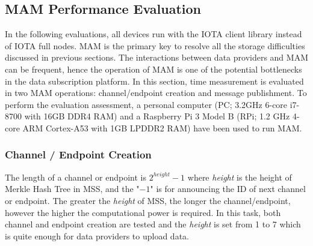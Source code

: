 \documentclass[10pt, conference, compsocconf]{IEEEtran}
\begin{document}
\subsection{MAM Performance Evaluation}
\label{section:mam_performance}
In the following evaluations, all devices run with the IOTA client library instead of IOTA full nodes. MAM is the primary key to resolve all the storage difficulties discussed in previous sections. The interactions between data providers and MAM can be frequent, hence the operation of MAM is one of the potential bottlenecks in the data subscription platform. In this section, time measurement is evaluated in two MAM operations: channel/endpoint creation and message publishment. To perform the evaluation assessment, a personal computer (PC; 3.2GHz 6-core i7-8700 with 16GB DDR4 RAM) and a Raspberry Pi 3 Model B (RPi; 1.2 GHz 4-core ARM Cortex-A53 with 1GB LPDDR2 RAM) have been used to run MAM.

\subsubsection{Channel / Endpoint Creation}
The length of a channel or endpoint is $2^{height}-1$ where \textit{height} is the height of Merkle Hash Tree in MSS, and the "$-1$" is for announcing the ID of next channel or endpoint. The greater the \textit{height} of MSS, the longer the channel/endpoint, however the higher the computational power is required. In this task, both channel and endpoint creation are tested and the \textit{height} is set from 1 to 7 which is quite enough for data providers to upload data.
\end{document}
